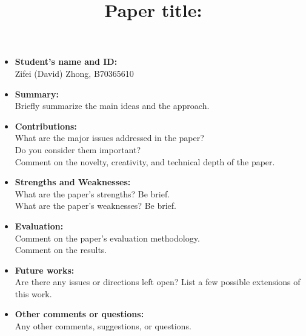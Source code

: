 \documentclass[11pt, oneside]{article}   	%
\title{Paper title:}
\date{}							%
\begin{document}
\maketitle

\begin{itemize}
\setlength\itemsep{3em}
\item [] \textbf{Student's name and ID: }\\
Zifei (David) Zhong, B70365610

\item [] \textbf{Summary:}\\
Briefly summarize the main ideas and the approach.

\item [] \textbf{Contributions:}\\
What are the major issues addressed in the paper?\\
Do you consider them important?\\
Comment on the novelty, creativity, and technical depth of the paper.\\

\item [] \textbf{Strengths and Weaknesses:}\\
What are the paper’s strengths? Be brief.\\
What are the paper's weaknesses? Be brief.\\

\item [] \textbf{Evaluation:}\\
Comment on the paper's evaluation methodology.\\
Comment on the results.\\

\item [] \textbf{Future works:}\\
Are there any issues or directions left open? 
List a few possible extensions of this work.

\item [] \textbf{Other comments or questions:}\\
Any other comments, suggestions, or questions.

\end{itemize}
\end{document}
